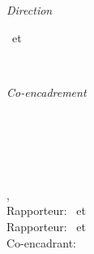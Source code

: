 \begin{titlepage}
	\begin{minipage}[t]{.27\textwidth}
		\raggedleft
		\textit{Direction}
	\end{minipage}
	\hspace*{15pt}
	\begin{minipage}[t]{.65\textwidth}
		\thesisFirstSupervisor\ et \thesisSecondSupervisor
	\end{minipage} \\[0mm]
	
	\begin{minipage}[t]{.27\textwidth}
		\raggedleft
		\textit{Co-encadrement}
	\end{minipage}
	\hspace*{15pt}
	\begin{minipage}[t]{.65\textwidth}
		\thesisFirstAdvisor
	\end{minipage} \\[10mm]

	\thesisDate \\

\end{titlepage}


\hfill
\vfill
{
	\small
	\noindent\textbf{\thesisName} \\
	\textit{\thesisTitle} \\
	\thesisSubject, \thesisDate \\
	Rapporteur: \thesisFirstReviewer\ et \thesisSecondReviewer \\
	Rapporteur: \thesisFirstSupervisor\ et \thesisSecondSupervisor \\
	Co-encadrant: \thesisFirstAdvisor \\[1.5em]
	\textbf{\thesisUniversity} \\
	\thesisUniversityInstitute \\
	\thesisUniversityDepartment \\
	\thesisUniversityStreetAddress \\
	\thesisUniversityPostalCode\ \thesisUniversityCity
}
